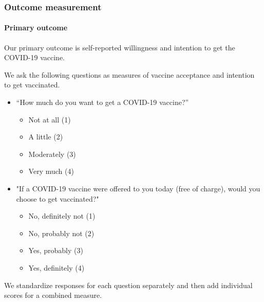\documentclass[letterpaper, 12pt, parskip=full,DIV=10]{scrartcl}
\begin{document}
\subsubsection{Outcome measurement}

\paragraph{Primary outcome}
Our primary outcome is self-reported willingness and intention to get the COVID-19 vaccine.

We ask the following questions as measures of vaccine acceptance and intention to get vaccinated. 

\begin{itemize}
\item “How much do you want to get a COVID-19 vaccine?”
\begin{itemize}
\item Not at all (1)
\item A little (2)
\item Moderately (3)
 \item Very much (4)
\end{itemize}
\item "If a COVID-19 vaccine were offered to you today (free of charge), would you choose to get vaccinated?"	
\begin{itemize}
\item No, definitely not (1) 
\item No, probably not (2)
\item Yes, probably (3)
\item Yes, definitely (4)
\end{itemize}
\end{itemize}

We standardize responses for each question separately and then add individual scores for a combined measure. 
\end{document}
